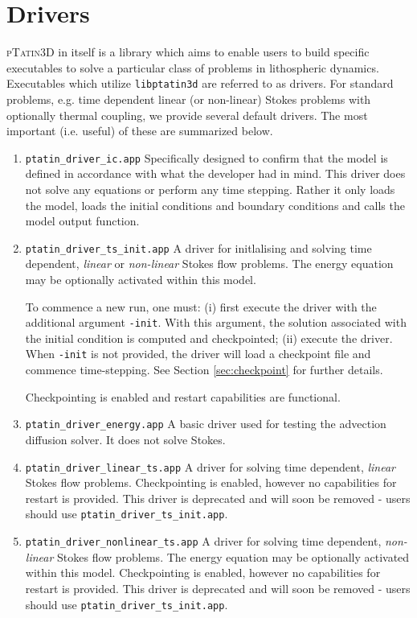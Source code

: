 \documentclass[paper=a4, fontsize=10pt,twoside]{scrartcl}
\newcommand{\ptat}{{{\textsc{pTatin3D}}}}
\newcommand{\unix}[1]{\texttt{\footnotesize #1}}
\begin{document}
\section{Drivers}
{\ptat} in itself is a library which aims to enable users to build specific executables to solve a particular class of problems in lithospheric dynamics.
Executables which utilize \unix{libptatin3d} are referred to as drivers.
For standard problems, e.g. time dependent linear (or non-linear) Stokes problems with optionally thermal coupling, we provide several default drivers.
The most important (i.e. useful) of these are summarized below.

\begin{enumerate}
	\item \unix{ptatin\_driver\_ic.app}
	Specifically designed to confirm that the model is defined in accordance with what the developer had in mind. This driver does not solve any equations or perform any time stepping. Rather it only loads the model, loads the initial conditions and boundary conditions and calls the model output function.

	\item \unix{ptatin\_driver\_ts\_init.app}
	A driver for initlalising and solving time dependent, \emph{linear} or \emph{non-linear} Stokes flow problems.
	The energy equation may be optionally activated within this model.

	To commence a new run, one must: (i) first execute the driver with the additional argument \texttt{-init}.
	With this argument, the solution associated with the initial condition is computed and checkpointed;
	(ii) execute the driver. When \texttt{-init} is not provided, the driver will load a checkpoint file and commence
	time-stepping. See Section \ref{sec:checkpoint} for further details.

	Checkpointing is enabled and restart capabilities are functional.

	\item \unix{ptatin\_driver\_energy.app}
	A basic driver used for testing the advection diffusion solver. It does not solve Stokes.

	\item \unix{ptatin\_driver\_linear\_ts.app}
	A driver for solving time dependent, \emph{linear} Stokes flow problems.
	Checkpointing is enabled, however no capabilities for restart is provided.
	This driver is deprecated and will soon be removed - users should use \unix{ptatin\_driver\_ts\_init.app}.

	\item \unix{ptatin\_driver\_nonlinear\_ts.app}
	A driver for solving time dependent, \emph{non-linear} Stokes flow problems.
	The energy equation may be optionally activated within this model.
	Checkpointing is enabled, however no capabilities for restart is provided.
	This driver is deprecated and will soon be removed - users should use \unix{ptatin\_driver\_ts\_init.app}.
\end{enumerate}
\end{document}
